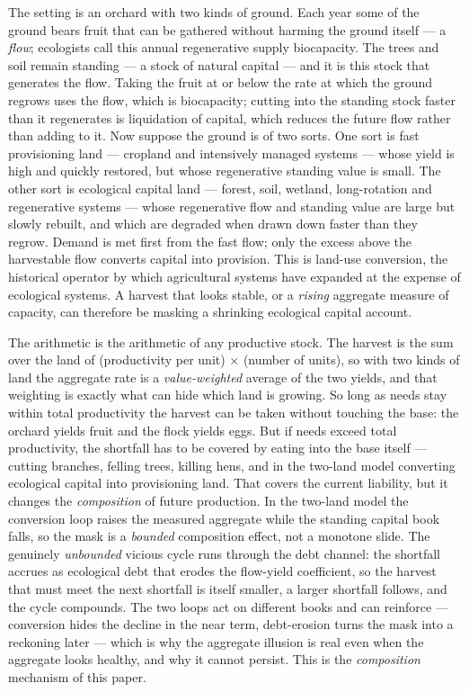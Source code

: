 \documentclass[11pt]{article}
\begin{document}
The setting is an orchard with two kinds of ground. Each year some of the ground bears fruit that can be gathered without harming the ground itself --- a \emph{flow}; ecologists call this annual regenerative supply biocapacity. The trees and soil remain standing --- a stock of natural capital --- and it is this stock that generates the flow. Taking the fruit at or below the rate at which the ground regrows uses the flow, which is biocapacity; cutting into the standing stock faster than it regenerates is liquidation of capital, which reduces the future flow rather than adding to it. Now suppose the ground is of two sorts. One sort is fast provisioning land --- cropland and intensively managed systems --- whose yield is high and quickly restored, but whose regenerative standing value is small. The other sort is ecological capital land --- forest, soil, wetland, long-rotation and regenerative systems --- whose regenerative flow and standing value are large but slowly rebuilt, and which are degraded when drawn down faster than they regrow. Demand is met first from the fast flow; only the excess above the harvestable flow converts capital into provision. This is land-use conversion, the historical operator by which agricultural systems have expanded at the expense of ecological systems. A harvest that looks stable, or a \emph{rising} aggregate measure of capacity, can therefore be masking a shrinking ecological capital account.

The arithmetic is the arithmetic of any productive stock. The harvest is the sum over the land of (productivity per unit) $\times$ (number of units), so with two kinds of land the aggregate rate is a \emph{value-weighted} average of the two yields, and that weighting is exactly what can hide which land is growing. So long as needs stay within total productivity the harvest can be taken without touching the base: the orchard yields fruit and the flock yields eggs. But if needs exceed total productivity, the shortfall has to be covered by eating into the base itself --- cutting branches, felling trees, killing hens, and in the two-land model converting ecological capital into provisioning land. That covers the current liability, but it changes the \emph{composition} of future production. In the two-land model the conversion loop raises the measured aggregate while the standing capital book falls, so the mask is a \emph{bounded} composition effect, not a monotone slide. The genuinely \emph{unbounded} vicious cycle runs through the debt channel: the shortfall accrues as ecological debt that erodes the flow-yield coefficient, so the harvest that must meet the next shortfall is itself smaller, a larger shortfall follows, and the cycle compounds. The two loops act on different books and can reinforce --- conversion hides the decline in the near term, debt-erosion turns the mask into a reckoning later --- which is why the aggregate illusion is real even when the aggregate looks healthy, and why it cannot persist. This is the \emph{composition} mechanism of this paper.
\end{document}
